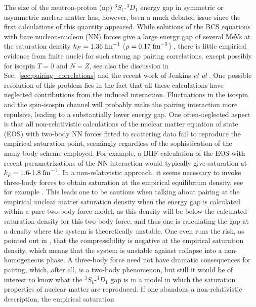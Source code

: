 \documentclass[rmp,aps,floatfix]{revtex4}
\begin{document}
The size of the neutron-proton (np) $^3S_1$-$^3D_1$ energy gap in 
symmetric or asymmetric 
nuclear matter has, however, been a much debated issue since the 
first calculations of this quantity appeared.  While 
solutions of the BCS equations with bare nucleon-nucleon (NN) forces 
give a large energy gap of several MeVs at the saturation density 
$k_F=1.36\;{\rm fm}^{-1}$ ($\rho=0.17\;{\rm fm}^{-3}$) 
\cite{alm90,vonder91,taka93,bls95,sedrakian1997,sedrakian2000,garrido2001},  
there is little empirical evidence from 
finite nuclei for such strong np pairing correlations, except
possibly for isospin $T=0$ and $N=Z$, see also
the discussion in Sec.~\ref{sec:pairing_correlations} and the recent
work of Jenkins {\em et al} \cite{jenkins}.  
One possible resolution of this problem lies in the fact 
that all these calculations have neglected contributions from the 
induced interaction.  Fluctuations in the isospin and the spin-isospin 
channel will probably make the pairing interaction more repulsive, 
leading to a substantially lower energy gap.
One often-neglected aspect is that all non-relativistic calculations 
of the nuclear matter equation of state (EOS) with two-body NN forces 
fitted to scattering data fail to reproduce the empirical saturation 
point, seemingly regardless of the sophistication of the 
many-body scheme employed. 
For example, a BHF calculation of the 
EOS with recent parametrizations of the NN interaction 
would typically give saturation at $k_F=1.6$-$1.8\;{\rm fm}
^{-1}$.  In a non-relativistic approach, it seems necessary to invoke 
three-body forces to obtain saturation at the empirical equilibrium 
density, see for example \cite{akmal98}.  
This leads one to be cautious when talking about pairing at 
the empirical nuclear matter saturation density when the energy gap 
is calculated within a pure two-body force model, as this density 
will be below the calculated saturation density for this two-body force, 
and thus one is calculating the gap at a density where the 
system is theoretically unstable.   
One even runs the risk, as pointed out in 
 \cite{jack83}, that 
the compressibility is negative at the empirical saturation density, 
which means that the system is unstable against collapse into a 
non-homogeneous phase.  
A three-body force need not have dramatic consequences 
for pairing, which, after all, is a two-body phenomenon, but still it 
would be of interest to know what the $^3S_1$-$^3D_1$ gap is in 
a model in which the saturation properties of nuclear matter are reproduced.  
If one abandons a non-relativistic description, the empirical saturation 
\end{document}
